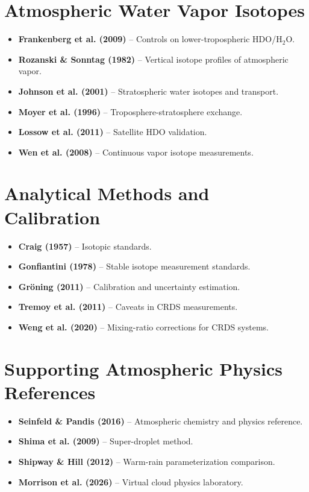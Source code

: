 \documentclass[11pt,a4paper]{article}
\begin{document}
\section{Atmospheric Water Vapor Isotopes}
\begin{itemize}
    \item \textbf{Frankenberg et al. (2009)} -- Controls on lower-tropospheric HDO/H$_2$O.
    \item \textbf{Rozanski \& Sonntag (1982)} -- Vertical isotope profiles of atmospheric vapor.
    \item \textbf{Johnson et al. (2001)} -- Stratospheric water isotopes and transport.
    \item \textbf{Moyer et al. (1996)} -- Troposphere-stratosphere exchange.
    \item \textbf{Lossow et al. (2011)} -- Satellite HDO validation.
    \item \textbf{Wen et al. (2008)} -- Continuous vapor isotope measurements.
\end{itemize}

\section{Analytical Methods and Calibration}
\begin{itemize}
    \item \textbf{Craig (1957)} -- Isotopic standards.
    \item \textbf{Gonfiantini (1978)} -- Stable isotope measurement standards.
    \item \textbf{Gröning (2011)} -- Calibration and uncertainty estimation.
    \item \textbf{Tremoy et al. (2011)} -- Caveats in CRDS measurements.
    \item \textbf{Weng et al. (2020)} -- Mixing-ratio corrections for CRDS systems.
\end{itemize}

\section{Supporting Atmospheric Physics References}
\begin{itemize}
    \item \textbf{Seinfeld \& Pandis (2016)} -- Atmospheric chemistry and physics reference.
    \item \textbf{Shima et al. (2009)} -- Super-droplet method.
    \item \textbf{Shipway \& Hill (2012)} -- Warm-rain parameterization comparison.
    \item \textbf{Morrison et al. (2026)} -- Virtual cloud physics laboratory.
\end{itemize}
\end{document}
